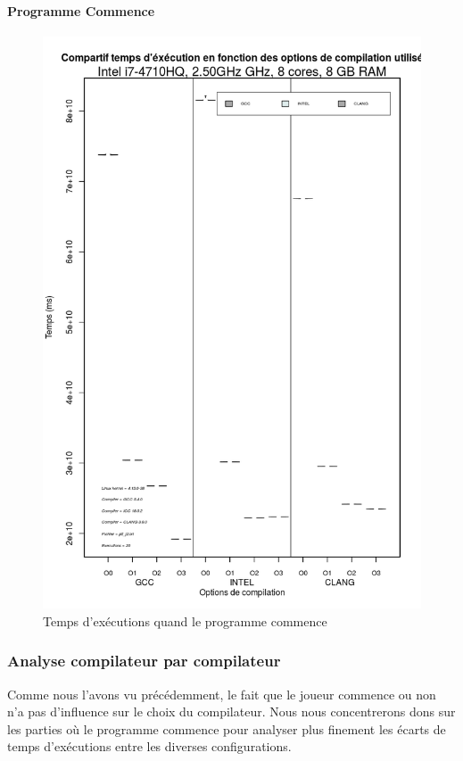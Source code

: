 \documentclass[
 aip,
 jmp,
 amsmath,amssymb,
 reprint
]{revtex4-1}
\begin{document}
\paragraph{Programme Commence}
\begin{figure}[ht]
  \caption{Temps d'exécutions quand le programme commence}
  \includegraphics[width=\linewidth, keepaspectratio=true]{GCCvsICCvsCLANG.png}
\end{figure}

\subsubsection{Analyse compilateur par compilateur}
Comme nous l'avons vu précédemment, le fait que le joueur commence ou non n'a pas d'influence sur le choix du compilateur. Nous nous concentrerons dons sur les parties où le programme commence pour analyser plus finement les écarts de temps d'exécutions entre les diverses configurations.\\
\end{document}
